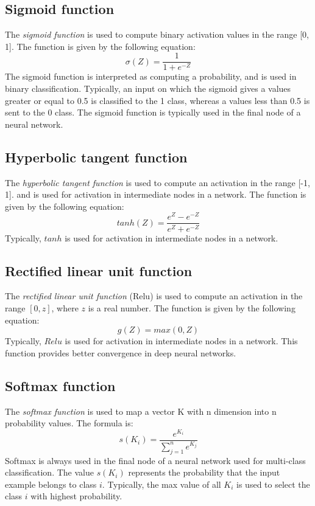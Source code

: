 \documentclass[12pt]{report}
\begin{document}
	\subsection{Sigmoid function}
	The {\em sigmoid function} is used to compute binary activation values in the range [0, 1]. The function is given by the following equation:
	\[
	\sigma(Z) = \frac{1}{1 + e^{-Z}}
	\] 
	The sigmoid function is interpreted as computing a probability, and is used in binary classification. Typically, an input on which the sigmoid  gives a values greater or equal to 0.5 is classified to the 1 class, whereas a values less than 0.5 is sent to the 0 class. The sigmoid function is typically used 
	in the final node of a neural network. 
	
	\subsection{Hyperbolic tangent function}
	The {\em hyperbolic tangent function} is used to compute an activation in the range [-1, 1]. and is used for activation in intermediate nodes 
	in a network. The function is given by the following equation:
	\[
	tanh(Z) = \frac{e^Z - e^{-Z}}{e^Z + e^{-Z}}
	\]
	Typically, $tanh$  is used for activation in intermediate nodes in a network.
	
	\subsection{Rectified linear unit function}
	The {\em rectified linear unit  function} (Relu) is used to compute an activation in the range $[0, z]$, where $z$ is a real number. 
	The function is given by the following equation:
	\[
	g(Z) = max(0, Z)
	\]
	Typically, $Relu$  is used for activation in intermediate nodes in a network. This function provides better convergence in deep neural networks. 
	
	\subsection{Softmax function}
	The {\em softmax function} is used to map a vector K with n dimension into n probability values. The formula is:
	\[
	s(K_i) = \frac{e^{K_i}}{\sum_{j=1}^{n}e^{K_j}}
	\]
	Softmax is always used in the final node of a neural network used for multi-class classification. The value $s(K_i)$ represents the probability that 
	the input example belongs to class $i$. Typically, the max value of all $K_i$ is used to select the class $i$ with highest probability. 
	
\end{document}
